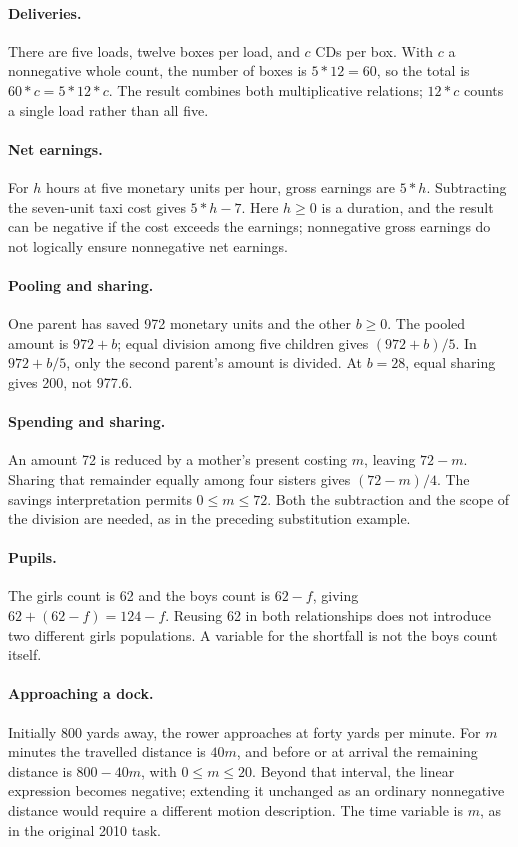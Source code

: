 \paragraph{Deliveries.}
There are five loads, twelve boxes per load, and \(c\) CDs per box.
With \(c\) a nonnegative whole count, the number of boxes is
\(5*12=60\), so the total is \(60*c=5*12*c\).
The result combines both multiplicative relations; \(12*c\)
counts a single load rather than all five.

\paragraph{Net earnings.}
For \(h\) hours at five monetary units per hour, gross earnings
are \(5*h\). Subtracting the seven-unit taxi cost gives \(5*h-7\).
Here \(h\geq0\) is a duration, and the result can be negative
if the cost exceeds the earnings; nonnegative gross earnings do not
logically ensure nonnegative net earnings.

\paragraph{Pooling and sharing.}
One parent has saved 972 monetary units and the other \(b\geq0\).
The pooled amount is \(972+b\); equal division among five children
gives \((972+b)/5\). In \(972+b/5\), only the second parent's
amount is divided. At \(b=28\), equal sharing gives 200, not 977.6.

\paragraph{Spending and sharing.}
An amount 72 is reduced by a mother's present costing \(m\),
leaving \(72-m\). Sharing that remainder equally among four
sisters gives \((72-m)/4\). The savings interpretation permits
\(0\leq m\leq72\). Both the subtraction and the scope of the
division are needed, as in the preceding substitution example.

\paragraph{Pupils.}
The girls count is 62 and the boys count is \(62-f\), giving
\(62+(62-f)=124-f\). Reusing 62 in both relationships does not
introduce two different girls populations. A variable for the
shortfall is not the boys count itself.

\paragraph{Approaching a dock.}
Initially 800 yards away, the rower approaches at forty yards per
minute. For \(m\) minutes the travelled distance is \(40m\),
and before or at arrival the remaining distance is \(800-40m\),
with \(0\leq m\leq20\). Beyond that interval, the linear
expression becomes negative; extending it unchanged as an ordinary
nonnegative distance would require a different motion description.
The time variable is \(m\), as in the original 2010 task.

